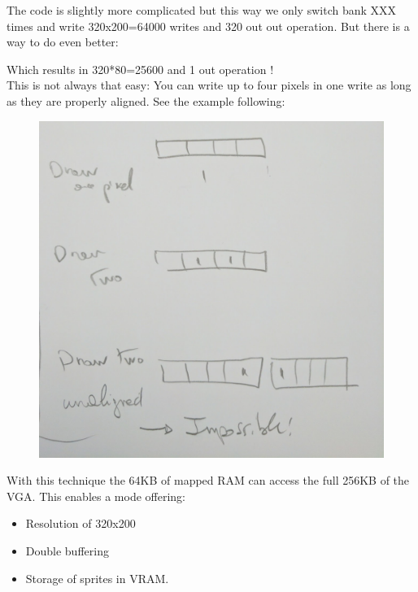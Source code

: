 \documentclass[book.tex]{subfiles}
\begin{document}
\begin{minipage}{\textwidth}

\end{minipage}

The code is slightly more complicated but this way we only switch bank XXX times and write 320x200=64000 writes and  320 out out operation. But there is a way to do even better: 

\begin{minipage}{\textwidth}

\end{minipage}

Which results in 320*80=25600 and 1 out operation !\\

This is not always that easy: You can write up to four pixels in one write as long as they are properly aligned. See the example following:
\begin{figure}[H]
  \centering
 \includegraphics[width=\textwidth]{imgs//vga_multiple_pixel_write.png}
\end{figure}


\par
With this technique the 64KB of mapped RAM can access the full 256KB of the VGA. This enables a mode offering:
\begin{itemize}
  \item Resolution of 320x200
  \item Double buffering
  \item Storage of sprites in VRAM.
\end{itemize}
\end{document}
